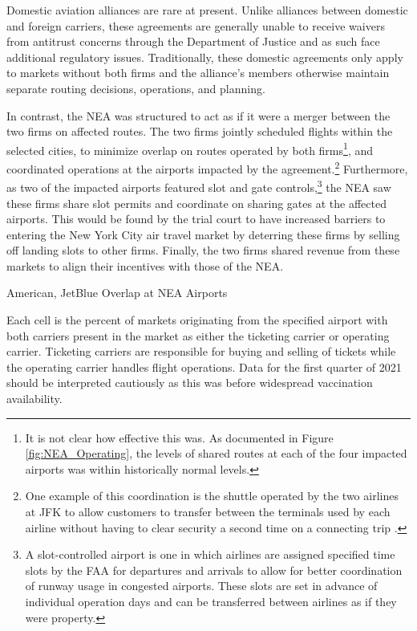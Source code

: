 \documentclass{article}
\begin{document}
	Domestic aviation alliances are rare at present. Unlike alliances between domestic and foreign carriers, these agreements are generally unable to receive waivers from antitrust concerns through the Department of Justice and as such face additional regulatory issues. Traditionally, these domestic agreements only apply to markets without both firms and the alliance's members otherwise maintain separate routing decisions, operations, and planning. 
	
	In contrast, the NEA was structured to act as if it were a merger between the two firms on affected routes. The two firms jointly scheduled flights within the selected cities, to minimize overlap on routes operated by both firms\footnote{It is not clear how effective this was. As documented in Figure \ref{fig:NEA_Operating}, the levels of shared routes at each of the four impacted airports was within historically normal levels.}, and coordinated operations at the airports impacted by the agreement.\footnote{One example of this coordination is the shuttle operated by the two airlines at JFK to allow customers to transfer between the terminals used by each airline without having to clear security a second time on a connecting trip \citep{griff_riding_2021}.} Furthermore, as two of the impacted airports featured slot and gate controls,\footnote{A slot-controlled airport is one in which airlines are assigned specified time slots by the FAA for departures and arrivals to allow for better coordination of runway usage in congested airports. These slots are set in advance of individual operation days and can be transferred between airlines as if they were property.} the NEA saw these firms share slot permits and coordinate on sharing gates at the affected airports. This would be found by the trial court to have increased barriers to entering the New York City air travel market by deterring these firms by selling off landing slots to other firms. Finally, the two firms shared revenue from these markets to align their incentives with those of the NEA. 

    \begin{table}[h]
		\caption{American, JetBlue Overlap at NEA Airports}
		\label{tab:NEA_Airport_Prescence}
        \vspace{-15mm}
        \begin{center}
         
        \end{center}
                \vspace{-5mm}
		\footnotesize{Each cell is the percent of markets originating from the specified airport with both carriers present in the market as either the ticketing carrier or operating carrier. Ticketing carriers are responsible for buying and selling of tickets while the operating carrier handles flight operations. Data for the first quarter of 2021 should be interpreted cautiously as this was before widespread vaccination availability.}
	\end{table}
    
\end{document}
